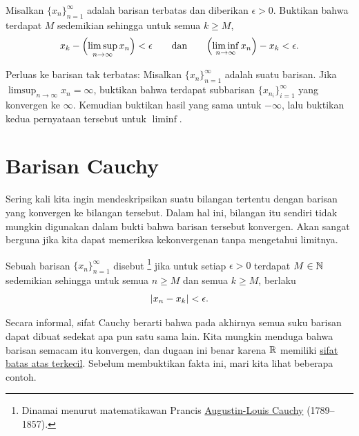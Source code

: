 \begin{exercise}
Misalkan $\{ x_n \}_{n=1}^\infty$ adalah barisan terbatas dan diberikan $\epsilon > 0$.
Buktikan bahwa terdapat $M$ sedemikian sehingga untuk semua $k \geq M$,
\begin{equation*}
x_k - \Bigl(\limsup_{n\to\infty} x_n\Bigr) < \epsilon \qquad \text{dan} \qquad
\Bigl(\liminf_{n\to\infty} x_n\Bigr) - x_k < \epsilon .
\end{equation*}
\end{exercise}

\begin{exercise} \label{exercise:extendsubseqlimsupinf}
Perluas  ke barisan tak terbatas:
Misalkan $\{ x_n \}_{n=1}^\infty$ adalah suatu barisan.
Jika $\limsup_{n\to\infty} x_n = \infty$, buktikan bahwa
terdapat subbarisan $\{ x_{n_i} \}_{i=1}^\infty$ yang konvergen ke $\infty$.
Kemudian buktikan hasil yang sama untuk $-\infty$, lalu buktikan kedua pernyataan tersebut untuk
$\liminf$.
\end{exercise}



\sectionnewpage
\section{Barisan Cauchy}
\label{sec:cauchy}


Sering kali kita ingin mendeskripsikan suatu bilangan tertentu
dengan barisan yang konvergen ke bilangan tersebut.  Dalam hal ini, bilangan
itu sendiri tidak mungkin digunakan dalam bukti bahwa barisan tersebut konvergen.
Akan sangat berguna jika kita dapat memeriksa kekonvergenan tanpa mengetahui
limitnya.

\begin{defn}
Sebuah barisan $\{ x_n \}_{n=1}^\infty$ disebut \emph{}%
\footnote{%
Dinamai menurut matematikawan Prancis
\href{https://en.wikipedia.org/wiki/Cauchy}{Augustin-Louis Cauchy} (1789--1857).} jika
untuk setiap $\epsilon > 0$ terdapat $M \in {\mathbb{N}}$ sedemikian sehingga
untuk semua $n \geq M$ dan semua $k \geq M$, berlaku
\begin{equation*}
\lvert {x_n - x_k} \rvert < \epsilon .
\end{equation*}
\end{defn}

Secara informal, sifat Cauchy berarti bahwa pada akhirnya semua suku barisan
dapat dibuat sedekat apa pun satu sama lain.  Kita mungkin menduga bahwa barisan
semacam itu konvergen, dan dugaan ini benar karena ${\mathbb{R}}$ memiliki
\hyperref[defn:lub]{sifat batas atas terkecil}.  Sebelum membuktikan fakta ini,
mari kita lihat beberapa contoh.

